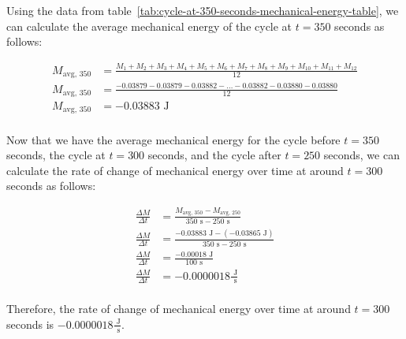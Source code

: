 \documentclass{article}
\begin{document}
            Using the data from table~\ref{tab:cycle-at-350-seconds-mechanical-energy-table}, we can calculate the average mechanical energy of the cycle at $t=350$ seconds as follows:
            
            \begin{equation}
                \begin{aligned}
                    M_{\text{avg, 350}} &= \frac{M_1 + M_2 + M_3 + M_4 + M_5 + M_6 + M_7 + M_8 + M_9 + M_{10} + M_{11} + M_{12}}{12} \\
                    M_{\text{avg, 350}} &= \frac{-0.03879 -0.03879 -0.03882 -  \ldots -0.03882 -0.03880 -0.03880}{12} \\
                    M_{\text{avg, 350}} &= -0.03883 \text{ J} \\
                \end{aligned}\label{eq:average-mechanical-energy-cycle-at-350-seconds}
            \end{equation}
            
            Now that we have the average mechanical energy for the cycle before $t=350$ seconds, the cycle at $t=300$ seconds, and the cycle after $t=250$ seconds, we can calculate the rate of change of mechanical energy over time at around $t=300$ seconds as follows:
            
            \begin{equation}
                \begin{aligned}
                    \frac{\Delta M}{\Delta t} &= \frac{M_{\text{avg, 350}} - M_{\text{avg, 250}}} {350 \text{ s} - 250 \text{ s}} \\
                    \frac{\Delta M}{\Delta t} &= \frac{-0.03883 \text{ J} - (-0.03865 \text{ J})} {350 \text{ s} - 250 \text{ s}} \\
                    \frac{\Delta M}{\Delta t} &= \frac{-0.00018 \text{ J}} {100 \text{ s}} \\
                    \frac{\Delta M}{\Delta t} &= -0.0000018 \frac{\text{ J}}{\text{ s}} \\
                \end{aligned}\label{eq:rate-of-change-of-mechanical-energy-over-time-around-300-seconds}
            \end{equation}
            
            Therefore, the rate of change of mechanical energy over time at around $t=300$ seconds is $-0.0000018 \frac{\text{ J}}{\text{ s}}$. \\
            
\end{document}
